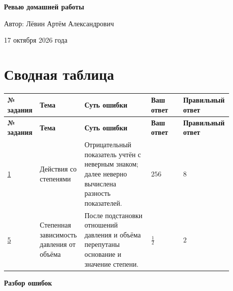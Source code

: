 \documentclass[12pt,a4paper]{article}
\begin{document}
\thispagestyle{empty}
\vspace*{\fill}
\begin{center}
{\LARGE\bfseries Ревью домашней работы\par}
\vspace{2.0cm}
{\large Автор: Лёвин Артём Александрович\par}
\vspace{0.8cm}
{\large 17 октября 2026 года\par}
\end{center}
\vspace*{\fill}
\begin{center}
\end{center}
\newpage

\section*{Сводная таблица}
\small
\setlength{\tabcolsep}{4pt}
\begin{longtable}{@{}>{\raggedright\arraybackslash}p{0.105\linewidth}>{\raggedright\arraybackslash}p{0.19\linewidth}>{\raggedright\arraybackslash}p{0.295\linewidth}>{\raggedright\arraybackslash}p{0.14\linewidth}>{\raggedright\arraybackslash}p{0.17\linewidth}@{}}
\toprule
\textbf{№ задания} & \textbf{Тема} & \textbf{Суть ошибки} & \textbf{Ваш ответ} & \textbf{Правильный ответ}\\
\midrule
\endfirsthead
\toprule
\textbf{№ задания} & \textbf{Тема} & \textbf{Суть ошибки} & \textbf{Ваш ответ} & \textbf{Правильный ответ}\\
\midrule
\endhead
\hyperref[task:1]{1} & Действия со степенями & Отрицательный показатель учтён с неверным знаком; далее неверно вычислена разность показателей. & $256$ & $8$\\
\midrule
\hyperref[task:5]{5} & Степенная зависимость давления от объёма & После подстановки отношений давления и объёма перепутаны основание и значение степени. & $\frac{1}{2}$ & $2$\\
\bottomrule
\end{longtable}
\normalsize

\newpage
\thispagestyle{empty}
\vspace*{\fill}
\begin{center}
{\LARGE\bfseries Разбор ошибок}
\end{center}
\vspace*{\fill}
\newpage
\end{document}
